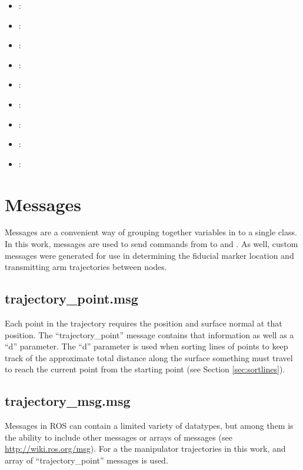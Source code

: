 \begin{itemize}

\item {} : 
\item {} : 
\item {} : 
\item {} : 
\item {} : 
\item {} : 
\item {} : 
\item {} : 
\item {} : 
\end{itemize}

\section{Messages}

Messages are a convenient way of grouping together variables in to a single class. In this work, messages are used to send commands from  to  and . As well, custom messages were generated for use in determining the fiducial marker location and transmitting arm trajectories between nodes.\\

\subsection{trajectory\_point.msg}
Each point in the trajectory requires the position and surface normal at that position. The ``trajectory\_point'' message contains that information as well as a ``d'' parameter. The ``d'' parameter is used when sorting lines of points to keep track of the approximate total distance along the surface something must travel to reach the current point from the starting point (see Section \ref{sec:sortlines}).\\
\subsection{trajectory\_msg.msg}
\label{sec:trajmsg}
Messages in ROS can contain a limited variety of datatypes, but among them is the ability to include other messages or arrays of messages (see \url{http://wiki.ros.org/msg}). For a the manipulator trajectories in this work, and array of ``trajectory\_point'' messages is used.\\

